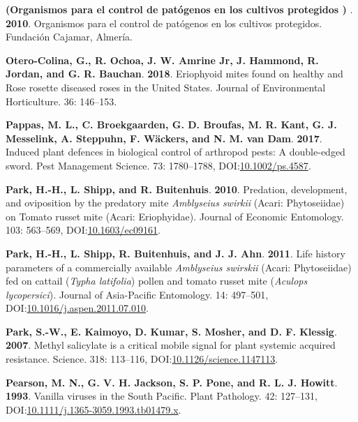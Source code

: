 \documentclass[12pt,final,CPage]{ufthesis}
\newlength{\cslhangindent}
\newenvironment{CSLReferences}[2] %
{%
	\setlength{\parindent}{0pt}
	\ifodd #1 \everypar{\setlength{\hangindent}{\cslhangindent}}\ignorespaces\fi
	\ifnum #2 > 0
	\setlength{\parskip}{#2\baselineskip}
	\fi
}%
{}
\begin{document}
{\begin{CSLReferences}{1}{0}
  \leavevmode{}%
  \textbf{(Organismos para el control de pat{ó}genos en los cultivos protegidos ) }. \textbf{2010}. Organismos para el control de pat{ó}genos en los cultivos protegidos. Fundaci{ó}n Cajamar, Almer{í}a.

  \leavevmode{}%
  \textbf{Otero-Colina, G., R. Ochoa, J. W. Amrine Jr, J. Hammond, R. Jordan, and G. R. Bauchan}. \textbf{2018}. Eriophyoid mites found on healthy and {Rose rosette diseased} roses in the {United States}. Journal of Environmental Horticulture. 36: 146--153.

  \leavevmode{}%
  \textbf{Pappas, M. L., C. Broekgaarden, G. D. Broufas, M. R. Kant, G. J. Messelink, A. Steppuhn, F. Wäckers, and N. M. van Dam}. \textbf{2017}. Induced plant defences in biological control of arthropod pests: A double-edged sword. Pest Management Science. 73: 1780--1788, DOI:\href{https://doi.org/10.1002/ps.4587}{10.1002/ps.4587}.

  \leavevmode{}%
  \textbf{Park, H.-H., L. Shipp, and R. Buitenhuis}. \textbf{2010}. Predation, development, and oviposition by the predatory mite {\emph{Amblyseius swirkii}} ({Acari}: {Phytoseiidae}) on {Tomato russet mite} ({Acari}: {Eriophyidae}). Journal of Economic Entomology. 103: 563--569, DOI:\href{https://doi.org/10.1603/ec09161}{10.1603/ec09161}.

  \leavevmode{}%
  \textbf{Park, H.-H., L. Shipp, R. Buitenhuis, and J. J. Ahn}. \textbf{2011}. Life history parameters of a commercially available {\emph{Amblyseius swirskii}} ({Acari}: {Phytoseiidae}) fed on cattail ({\emph{Typha latifolia}}) pollen and tomato russet mite ({\emph{Aculops lycopersici}}). Journal of Asia-Pacific Entomology. 14: 497--501, DOI:\href{https://doi.org/10.1016/j.aspen.2011.07.010}{10.1016/j.aspen.2011.07.010}.

  \leavevmode{}%
  \textbf{Park, S.-W., E. Kaimoyo, D. Kumar, S. Mosher, and D. F. Klessig}. \textbf{2007}. Methyl salicylate is a critical mobile signal for plant systemic acquired resistance. Science. 318: 113--116, DOI:\href{https://doi.org/10.1126/science.1147113}{10.1126/science.1147113}.

  \leavevmode{}%
  \textbf{Pearson, M. N., G. V. H. Jackson, S. P. Pone, and R. L. J. Howitt}. \textbf{1993}. Vanilla viruses in the {South Pacific}. Plant Pathology. 42: 127--131, DOI:\href{https://doi.org/10.1111/j.1365-3059.1993.tb01479.x}{10.1111/j.1365-3059.1993.tb01479.x}.


\end{CSLReferences}}
\end{document}
